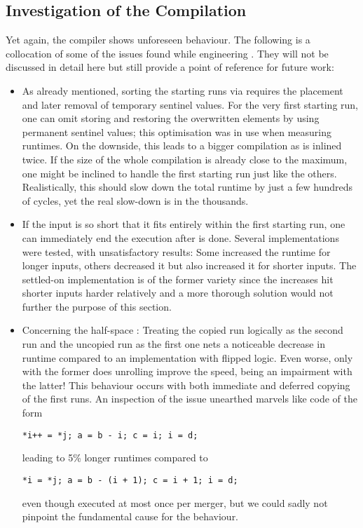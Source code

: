 \subsection*{Investigation of the Compilation}
\label{sec:tasklet:merge:compilation}

Yet again, the compiler shows unforeseen behaviour.
The following is a collocation of some of the issues found while engineering \MS{}.
They will not be discussed in detail here but still provide a point of reference for future work:
\begin{itemize}
	\item
	As already mentioned, sorting the starting runs via \ShS{} requires the placement and later removal of temporary sentinel values.
	For the very first starting run, one can omit storing and restoring the overwritten elements by using permanent sentinel values;
	this optimisation was in use when measuring runtimes.
	On the downside, this leads to a bigger compilation as \ShS{} is inlined twice.
	If the size of the whole compilation is already close to the maximum, one might be inclined to handle the first starting run just like the others.
	Realistically, this should slow down the total runtime by just a few hundreds of cycles, yet the real slow-down is in the thousands.

	\item
	If the input is so short that it fits entirely within the first starting run, one can immediately end the execution after \ShS{} is done.
	Several implementations were tested, with unsatisfactory results:
	Some increased the runtime for longer inputs, others decreased it but also increased it for shorter inputs.
	The settled-on implementation is of the former variety since the increases hit shorter inputs harder relatively and a more thorough solution would not further the purpose of this section.

	\item
	Concerning the half-space \MS{}:
	Treating the copied run logically as the second run and the uncopied run as the first one nets a noticeable decrease in runtime compared to an implementation with flipped logic.
	Even worse, only with the former does unrolling improve the speed, being an impairment with the latter!
	This behaviour occurs with both immediate and deferred copying of the first runs.
	An inspection of the issue unearthed marvels like code of the form
	\begin{center}
		\vspace{-\baselineskip}
		\texttt{*i++ = *j; a = b - i; c = i; i = d;}
	\end{center}
	leading to 5\% longer runtimes compared to
	\begin{center}
		\texttt{*i = *j; a = b - (i + 1); c = i + 1; i = d;}
	\end{center}
	even though executed at most once per merger, but we could sadly not pinpoint the fundamental cause for the behaviour.
\end{itemize}
